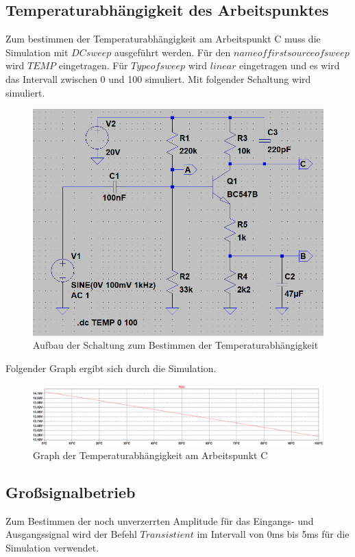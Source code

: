             \newpage
        \subsection{Temperaturabhängigkeit des Arbeitspunktes}
            Zum bestimmen der Temperaturabhängigkeit am Arbeitspunkt C muss die Simulation mit $DC sweep$ ausgeführt werden. Für den $name of first source of sweep$ wird $TEMP$ eingetragen. Für $Type of sweep$ wird $linear$ eingetragen und es wird das Intervall zwischen 0 und 100 simuliert. Mit folgender Schaltung wird simuliert.

            \begin{figure}[h!]
                \centering
                \includegraphics[width=0.7\linewidth]{324.PNG}
                \caption{Aufbau der Schaltung zum Bestimmen der Temperaturabhängigkeit}
            \end{figure}

            Folgender Graph ergibt sich durch die Simulation.
            \begin{figure}[h!]
                \centering
                \includegraphics[width=\linewidth]{3241.PNG}
                \caption{Graph der Temperaturabhängigkeit am Arbeitspunkt C}
            \end{figure}


            \newpage
        \subsection{Großsignalbetrieb}
            Zum Bestimmen der noch unverzerrten Amplitude für das Eingangs- und Ausgangssignal wird der Befehl $Transistient$ im Intervall von 0ms bis 5ms für die Simulation verwendet. 

